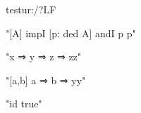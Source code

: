 \documentclass{article}
\begin{document}

\begin{mmttheory}{test}{ur:/?LF}


"[A] impI [p: ded A] andI p p"

\begin{mmtcontext}


\begin{mmtcontext}
"x ⇒ y ⇒ z ⇒ zz"
\end{mmtcontext}

"[a,b] a ⇒ b ⇒ yy"

\end{mmtcontext}
"id true"

\end{mmttheory}
\end{document}
